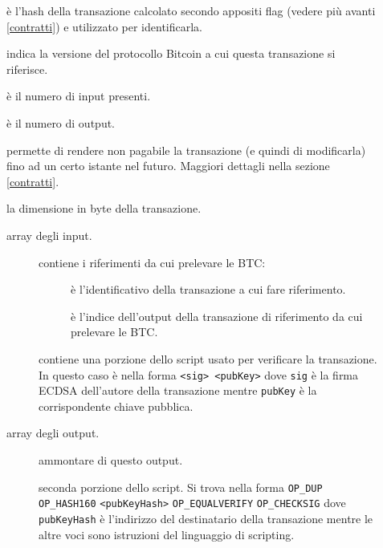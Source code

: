 \begin{description}
    \item[] è l'hash della transazione calcolato secondo appositi flag (vedere più avanti \ref{contratti}) e utilizzato per identificarla.
    \item[] indica la versione del protocollo Bitcoin a cui questa transazione si riferisce.
    \item[] è il numero di input presenti.
    \item[] è il numero di output.
    \item[] permette di rendere non pagabile la transazione (e quindi di modificarla) fino ad un certo istante nel futuro. Maggiori dettagli nella sezione \ref{contratti}.
    \item[] la dimensione in byte della transazione.
    \item[] array degli input.\begin{description}
      \item[] contiene i riferimenti da cui prelevare le BTC:\begin{description}
            \item[] è l'identificativo della transazione a cui fare riferimento.
            \item[] è l'indice dell'output della transazione di riferimento da cui prelevare le BTC.
        \end{description}
      \item[] contiene una porzione dello script usato per verificare la transazione. In questo caso è nella forma \verb|<sig> <pubKey>| dove \verb|sig| è la firma ECDSA dell'autore della transazione mentre \verb|pubKey| è la corrispondente chiave pubblica.
      \end{description}
    \item[] array degli output.\begin{description}
      \item[] ammontare di questo output.
      \item[] seconda porzione dello script. Si trova nella forma \verb|OP_DUP| \verb|OP_HASH160| \verb|<pubKeyHash>| \verb|OP_EQUALVERIFY| \verb|OP_CHECKSIG| dove \verb|pubKeyHash| è l'indirizzo del destinatario della transazione mentre le altre voci sono istruzioni del linguaggio di scripting.
    \end{description}
\end{description}

